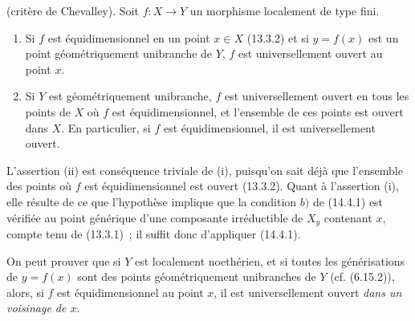 \begin{corollary}[14.4.4]
(critère de Chevalley). Soit $f:X\to Y$ un morphisme localement de type fini.
\begin{enumerate}[label=(\roman*)]
  \item Si $f$ est équidimensionnel en un point $x\in X$ (13.3.2) et si
  $y=f(x)$ est un point géométriquement unibranche de $Y$, $f$ est
  universellement ouvert au point $x$.
  \item Si $Y$ est géométriquement unibranche, $f$ est universellement ouvert en
  tous les points de $X$ où $f$ est équidimensionnel, et l'ensemble de ces points
  est ouvert dans $X$. En particulier, si $f$ est équidimensionnel, il est
  universellement ouvert.
\end{enumerate}
\end{corollary}

L'assertion (ii) est conséquence triviale de (i), puisqu'on sait déjà que l'ensemble
des points où $f$ est équidimensionnel est ouvert (13.3.2). Quant à l'assertion (i),
elle résulte de ce que l'hypothèse implique que la condition $b)$ de (14.4.1) est
vérifiée au point générique d'une composante irréductible de $X_y$ contenant $x$,
compte tenu de (13.3.1)~; il suffit donc d'appliquer (14.4.1).

\begin{remark}[14.4.5]
\label{IV.14.4.5-fr}
On peut prouver que si $Y$ est localement noethérien, et si toutes les générisations
de $y=f(x)$ sont des points géométriquement unibranches de $Y$ (cf. (6.15.2)),
alors, si $f$ est équidimensionnel au point $x$, il est universellement ouvert
\emph{dans un voisinage de $x$}.
\end{remark}

